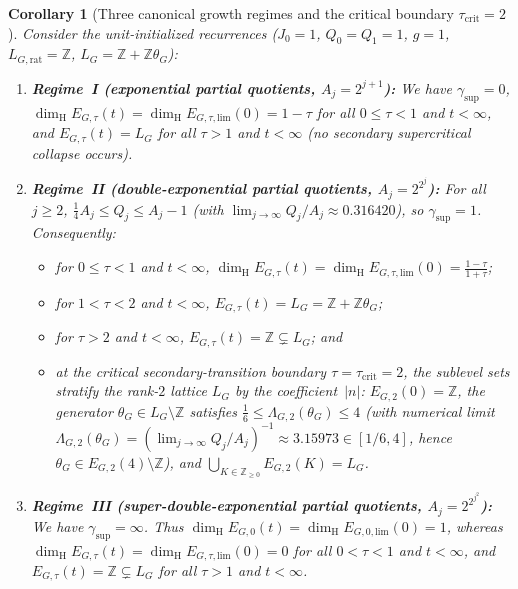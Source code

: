 \documentclass[11pt]{article}
\newtheorem{corollary}[theorem]{Corollary}
\theoremstyle{definition}
\theoremstyle{remark}
\newcommand{\Z}{\mathbb{Z}}
\newcommand{\dimH}{\dim_{\mathrm{H}}}
\newcommand{\Lam}{\Lambda}
\begin{document}
\begin{corollary}[Three canonical growth regimes and the critical boundary $\tau_{\mathrm{crit}}=2$]\label{cor:growing-rec-three-regimes}
Consider the unit-initialized recurrences ($J_0=1$, $Q_0=Q_1=1$, $g=1$,
$L_{G,\mathrm{rat}}=\Z$, $L_G=\Z+\Z\theta_G$):
\begin{enumerate}[label=(\roman*),leftmargin=2.2em]
\item \textbf{Regime~I (exponential partial quotients, $A_j=2^{j+1}$):}
We have $\gamma_{\sup}=0$, $\dimH E_{G,\tau}(t)=\dimH E_{G,\tau,\mathrm{lim}}(0)=1-\tau$
for all $0\le\tau<1$ and $t<\infty$, and $E_{G,\tau}(t)=L_G$ for all $\tau>1$ and $t<\infty$
(no secondary supercritical collapse occurs).
\item \textbf{Regime~II (double-exponential partial quotients, $A_j=2^{2^j}$):}
For all $j\ge2$, $\frac14 A_j\le Q_j\le A_j-1$ (with $\lim_{j\to\infty}Q_j/A_j\approx0.316420$),
so $\gamma_{\sup}=1$. Consequently:
\begin{itemize}[leftmargin=1.5em]
\item for $0\le\tau<1$ and $t<\infty$, $\dimH E_{G,\tau}(t)=\dimH E_{G,\tau,\mathrm{lim}}(0)=\frac{1-\tau}{1+\tau}$;
\item for $1<\tau<2$ and $t<\infty$, $E_{G,\tau}(t)=L_G=\Z+\Z\theta_G$;
\item for $\tau>2$ and $t<\infty$, $E_{G,\tau}(t)=\Z\subsetneq L_G$; and
\item at the critical secondary-transition boundary $\tau=\tau_{\mathrm{crit}}=2$,
the sublevel sets stratify the rank-$2$ lattice $L_G$ by the coefficient~$|n|$:
$E_{G,2}(0)=\Z$, the generator $\theta_G\in L_G\setminus\Z$ satisfies
$\frac16\le\Lam_{G,2}(\theta_G)\le 4$ (with numerical limit
$\Lam_{G,2}(\theta_G)=(\lim_{j\to\infty}Q_j/A_j)^{-1}\approx3.15973\in[1/6,4]$, hence
$\theta_G\in E_{G,2}(4)\setminus\Z$), and $\bigcup_{K\in\Z_{\ge0}}E_{G,2}(K)=L_G$.
\end{itemize}
\item \textbf{Regime~III (super-double-exponential partial quotients, $A_j=2^{2^{j^2}}$):}
We have $\gamma_{\sup}=\infty$. Thus $\dimH E_{G,0}(t)=\dimH E_{G,0,\mathrm{lim}}(0)=1$,
whereas $\dimH E_{G,\tau}(t)=\dimH E_{G,\tau,\mathrm{lim}}(0)=0$ for all $0<\tau<1$
and $t<\infty$, and $E_{G,\tau}(t)=\Z\subsetneq L_G$ for all $\tau>1$ and $t<\infty$.
\end{enumerate}
\end{corollary}
\end{document}
